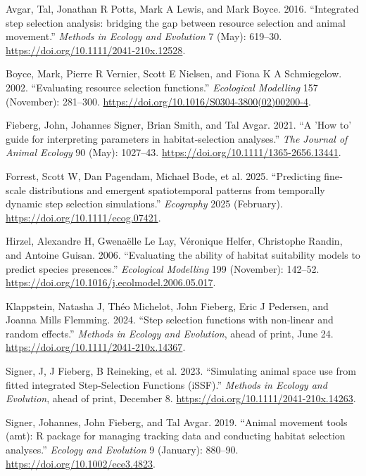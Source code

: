 \documentclass[
  letterpaper,
  DIV=11,
  numbers=noendperiod]{scrartcl}
\newlength{\cslhangindent}
\newenvironment{CSLReferences}[2] %
 {\begin{list}{}{%
  \setlength{\itemindent}{0pt}
  \setlength{\leftmargin}{0pt}
  \setlength{\parsep}{0pt}
  \ifodd #1
   \setlength{\leftmargin}{\cslhangindent}
   \setlength{\itemindent}{-1\cslhangindent}
  \fi
  \setlength{\itemsep}{#2\baselineskip}}}
 {\end{list}}
\begin{document}
\protect{}\label{refs}
\begin{CSLReferences}{1}{1}
Avgar, Tal, Jonathan R Potts, Mark A Lewis, and Mark Boyce. 2016.
{``{Integrated step selection analysis: bridging the gap between
resource selection and animal movement}.''} \emph{Methods in Ecology and
Evolution} 7 (May): 619--30.
\url{https://doi.org/10.1111/2041-210x.12528}.

Boyce, Mark, Pierre R Vernier, Scott E Nielsen, and Fiona K A
Schmiegelow. 2002. {``{Evaluating resource selection functions}.''}
\emph{Ecological Modelling} 157 (November): 281--300.
\url{https://doi.org/10.1016/S0304-3800(02)00200-4}.

Fieberg, John, Johannes Signer, Brian Smith, and Tal Avgar. 2021. {``{A
'How to' guide for interpreting parameters in habitat-selection
analyses}.''} \emph{The Journal of Animal Ecology} 90 (May): 1027--43.
\url{https://doi.org/10.1111/1365-2656.13441}.

Forrest, Scott W, Dan Pagendam, Michael Bode, et al. 2025.
{``{Predicting fine‐scale distributions and emergent spatiotemporal
patterns from temporally dynamic step selection simulations}.''}
\emph{Ecography} 2025 (February).
\url{https://doi.org/10.1111/ecog.07421}.

Hirzel, Alexandre H, Gwenaëlle Le Lay, Véronique Helfer, Christophe
Randin, and Antoine Guisan. 2006. {``{Evaluating the ability of habitat
suitability models to predict species presences}.''} \emph{Ecological
Modelling} 199 (November): 142--52.
\url{https://doi.org/10.1016/j.ecolmodel.2006.05.017}.

Klappstein, Natasha J, Théo Michelot, John Fieberg, Eric J Pedersen, and
Joanna Mills Flemming. 2024. {``{Step selection functions with
non‐linear and random effects}.''} \emph{Methods in Ecology and
Evolution}, ahead of print, June 24.
\url{https://doi.org/10.1111/2041-210x.14367}.

Signer, J, J Fieberg, B Reineking, et al. 2023. {``{Simulating animal
space use from fitted integrated Step‐Selection Functions (iSSF)}.''}
\emph{Methods in Ecology and Evolution}, ahead of print, December 8.
\url{https://doi.org/10.1111/2041-210x.14263}.

Signer, Johannes, John Fieberg, and Tal Avgar. 2019. {``{Animal movement
tools (amt): R package for managing tracking data and conducting habitat
selection analyses}.''} \emph{Ecology and Evolution} 9 (January):
880--90. \url{https://doi.org/10.1002/ece3.4823}.

\end{CSLReferences}
\end{document}
